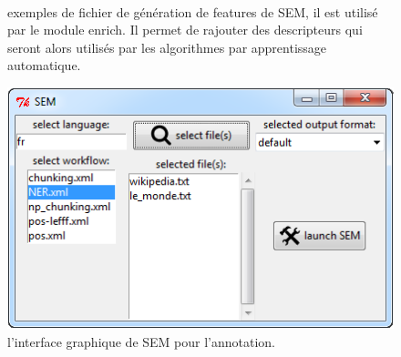 \documentclass[PhD-Yoann-Dupont.tex]{subfiles}
\begin{document}
\begin{figure}[ht!]
\footnotesize
\begin{xml}
\\
\end{xml}
\caption{exemples de fichier de génération de features de SEM, il est utilisé par le module enrich. Il permet de rajouter des descripteurs qui seront alors utilisés par les algorithmes par apprentissage automatique.}
\label{fig:sem-features}
\end{figure}


\begin{figure}[ht!]
\centering
\includegraphics[scale=1.0]{images/SEM/gui}
\caption{l'interface graphique de SEM pour l'annotation.}
\label{fig:sem-GUI}
\end{figure}
\end{document}
